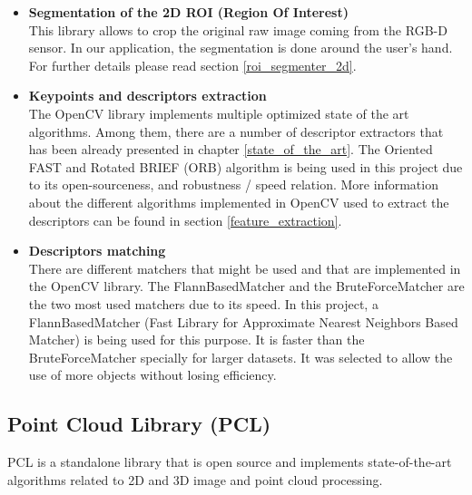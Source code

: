 		\begin{itemize}
		\item\textbf{Segmentation of the 2D ROI (Region Of Interest)\\ }
		This library allows to crop the original raw image coming from the RGB-D sensor. 
		In our application, the segmentation is done around the user's hand. 
		For further details please read section \ref{roi_segmenter_2d}. 
		

		\item\textbf{ {Keypoints and descriptors extraction\\ }}
		 The OpenCV library implements multiple optimized state of the art algorithms. 
		 Among them, there are a number of descriptor extractors that has been already presented in chapter \ref{state_of_the_art}. 
		 The Oriented FAST and Rotated BRIEF (ORB)\cite{orb} algorithm is being used in this project due to its open-sourceness, and robustness / speed relation. 
		 More information about the different algorithms implemented in OpenCV used to extract the descriptors can be found in section \ref{feature_extraction}.


		\item\textbf{ {Descriptors matching\\ } }
		There are different matchers that might be used and that are implemented in the OpenCV library.
		The FlannBasedMatcher and the BruteForceMatcher are the two most used matchers due to its speed. 
		In this project, a FlannBasedMatcher (Fast Library for Approximate Nearest Neighbors Based Matcher) is being used for this purpose. 
		It is faster than the BruteForceMatcher specially for larger datasets. 
		It was selected to allow the use of more objects without losing efficiency. 
		\end{itemize}

	\subsection{Point Cloud Library (PCL)}
\label{pcl}
PCL is a standalone library that is open source and implements state-of-the-art algorithms related to 2D and 3D image and point cloud processing. \\

